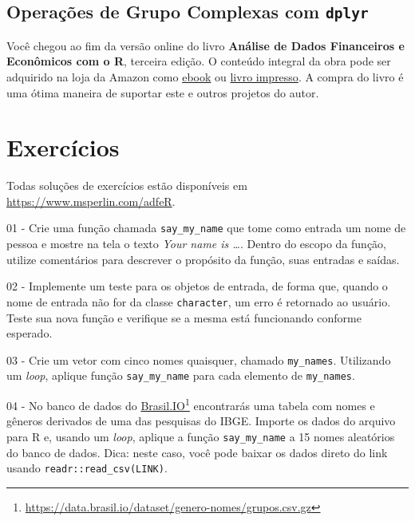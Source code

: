 \documentclass[
  11pt,
]{book}
\newenvironment{pleasebuyit}
{\begin{noteblock}
		
	} {\end{noteblock}}
\begin{document}
\hypertarget{operauxe7uxf5es-de-grupo-complexas-com-dplyr}{%
\subsection{\texorpdfstring{Operações de Grupo Complexas com \texttt{dplyr}}{Operações de Grupo Complexas com dplyr}}\label{operauxe7uxf5es-de-grupo-complexas-com-dplyr}}

\begin{pleasebuyit}
Você chegou ao fim da versão online do livro \textbf{Análise de Dados
Financeiros e Econômicos com o R}, terceira edição. O conteúdo integral
da obra pode ser adquirido na loja da Amazon como
\href{https://www.amazon.com.br/dp/B08WNC27ZY}{ebook} ou
\href{https://www.amazon.com/dp/B08WP8CCDB}{livro impresso}. A compra do
livro é uma ótima maneira de suportar este e outros projetos do autor.
\end{pleasebuyit}

\hypertarget{exerc-programacao}{%
\section{Exercícios}\label{exerc-programacao}}

Todas soluções de exercícios estão disponíveis em \url{https://www.msperlin.com/adfeR}.

01 -
Crie uma função chamada \texttt{say\_my\_name} que tome como entrada um nome de pessoa e mostre na tela o texto \emph{Your name is \ldots{}}. Dentro do escopo da função, utilize comentários para descrever o propósito da função, suas entradas e saídas.

02 -
Implemente um teste para os objetos de entrada, de forma que, quando o nome de entrada não for da classe \texttt{character}, um erro é retornado ao usuário. Teste sua nova função e verifique se a mesma está funcionando conforme esperado.

03 -
Crie um vetor com cinco nomes quaisquer, chamado \texttt{my\_names}. Utilizando um \emph{loop}, aplique função \texttt{say\_my\_name} para cada elemento de \texttt{my\_names}.

04 -
No banco de dados do \href{https://data.brasil.io/dataset/genero-nomes/grupos.csv.gz}{Brasil.IO}\footnote{\url{https://data.brasil.io/dataset/genero-nomes/grupos.csv.gz}} encontrarás uma tabela com nomes e gêneros derivados de uma das pesquisas do IBGE. Importe os dados do arquivo para R e, usando um \emph{loop}, aplique a função \texttt{say\_my\_name} a 15 nomes aleatórios do banco de dados. Dica: neste caso, você pode baixar os dados direto do link usando \texttt{readr::read\_csv(LINK)}.
\end{document}
